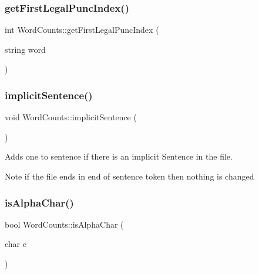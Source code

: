 \subsubsection{\texorpdfstring{get\+First\+Legal\+Punc\+Index()}{getFirstLegalPuncIndex()}}
{\footnotesize\ttfamily int Word\+Counts\+::get\+First\+Legal\+Punc\+Index (\begin{DoxyParamCaption}\item[{string}]{word }\end{DoxyParamCaption})}

\mbox{\label{class_word_counts_a5e4bfc1cdfb59e0243bbd0404b9fc9b0}} 
\subsubsection{\texorpdfstring{implicit\+Sentence()}{implicitSentence()}}
{\footnotesize\ttfamily void Word\+Counts\+::implicit\+Sentence (\begin{DoxyParamCaption}{ }\end{DoxyParamCaption})}



Adds one to sentence if there is an implicit Sentence in the file. 

\begin{DoxyNote}{Note}
if the file ends in end of sentence token then nothing is changed 
\end{DoxyNote}
\mbox{\label{class_word_counts_ae1ba379747b777457ad9e0a103193c65}} 
\subsubsection{\texorpdfstring{is\+Alpha\+Char()}{isAlphaChar()}}
{\footnotesize\ttfamily bool Word\+Counts\+::is\+Alpha\+Char (\begin{DoxyParamCaption}\item[{char}]{c }\end{DoxyParamCaption})}

\mbox{\label{class_word_counts_a94a625bf72762f6c42e6a0f42a0c7a33}} 
